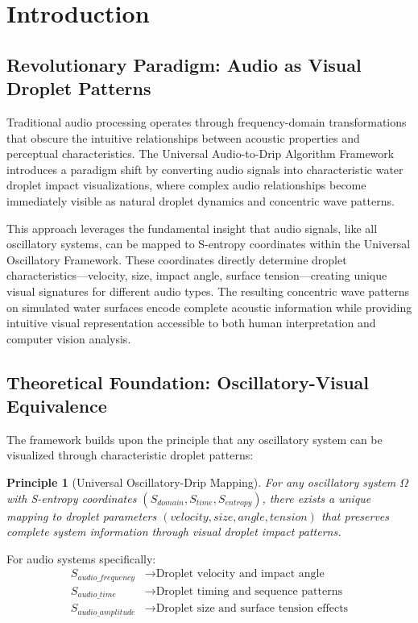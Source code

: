 \documentclass[12pt,a4paper]{article}
\newtheorem{principle}{Principle}
\begin{document}
\section{Introduction}

\subsection{Revolutionary Paradigm: Audio as Visual Droplet Patterns}

Traditional audio processing operates through frequency-domain transformations that obscure the intuitive relationships between acoustic properties and perceptual characteristics. The Universal Audio-to-Drip Algorithm Framework introduces a paradigm shift by converting audio signals into characteristic water droplet impact visualizations, where complex audio relationships become immediately visible as natural droplet dynamics and concentric wave patterns.

This approach leverages the fundamental insight that audio signals, like all oscillatory systems, can be mapped to S-entropy coordinates within the Universal Oscillatory Framework. These coordinates directly determine droplet characteristics—velocity, size, impact angle, surface tension—creating unique visual signatures for different audio types. The resulting concentric wave patterns on simulated water surfaces encode complete acoustic information while providing intuitive visual representation accessible to both human interpretation and computer vision analysis.

\subsection{Theoretical Foundation: Oscillatory-Visual Equivalence}

The framework builds upon the principle that any oscillatory system can be visualized through characteristic droplet patterns:

\begin{principle}[Universal Oscillatory-Drip Mapping]
For any oscillatory system $\Omega$ with S-entropy coordinates $(S_{domain}, S_{time}, S_{entropy})$, there exists a unique mapping to droplet parameters $(velocity, size, angle, tension)$ that preserves complete system information through visual droplet impact patterns.
\end{principle}

For audio systems specifically:
\begin{align}
S_{audio\_frequency} &\rightarrow \text{Droplet velocity and impact angle} \\
S_{audio\_time} &\rightarrow \text{Droplet timing and sequence patterns} \\
S_{audio\_amplitude} &\rightarrow \text{Droplet size and surface tension effects}
\end{align}
\end{document}
